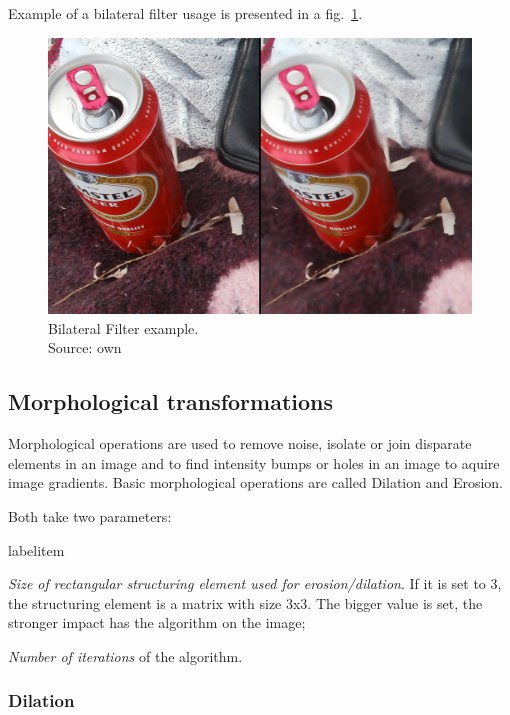 \documentclass[a4paper,onecolumn,oneside,12pt]{memoir}
\makeatletter
\renewenvironment{itemize}{
  \begin{list}{  
  \csname labelitem\romannumeral\the\@listdepth\endcsname}{
  \setlength{\leftmargin}{1em}
	\setlength{\topsep}{6pt}%
	\setlength{\partopsep}{0pt}%
	\setlength{\parskip}{0pt}%
	\setlength{\parsep}{0pt}%
	\setlength{\itemsep}{0pt}}
}{
  \end{list}
}
\makeatother
\begin{document}
Example of a bilateral filter usage is presented in a fig.~\ref{bilateralFilterExample}.

\begin{figure}[!ht]
\begin{center}
\includegraphics[scale=0.1]{images/BilateralFilterExample.jpg}
\caption{Bilateral Filter example. \\
Source: own}
\label{bilateralFilterExample}
\end{center}
\end{figure}

\subsection{Morphological transformations}

Morphological operations are used to remove noise, isolate or join disparate elements in an image 
and to find intensity bumps or holes in an image to aquire image gradients. Basic  morphological
operations are called Dilation and Erosion.

Both take two parameters:

\begin{itemize}
  \item \textit{Size of rectangular structuring element used for erosion/dilation}. If it is set to
        3, the structuring element is a matrix with size 3x3. The bigger value is set, the stronger
        impact has the algorithm on the image;
  \item \textit{Number of iterations} of the algorithm.
\end{itemize}

\subsubsection{Dilation}
\end{document}
